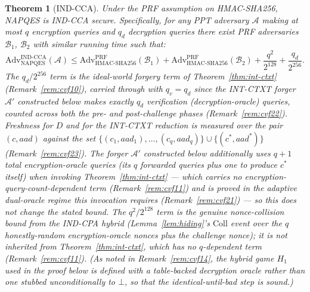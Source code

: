 \documentclass[11pt,a4paper]{article}
\newtheorem{theorem}{Theorem}[section]
\begin{document}
\begin{theorem}[IND-CCA]\label{thm:ind-cca}
  Under the PRF assumption on HMAC-SHA256, NAPQES is IND-CCA secure.
  Specifically, for any PPT adversary $\mathcal{A}$ making at most $q$
  encryption queries and $q_d$ decryption queries there exist PRF adversaries
  $\mathcal{B}_1$, $\mathcal{B}_2$ with similar running time such that:
  \[
    \mathrm{Adv}^{\mathrm{IND\text{-}CCA}}_{\mathrm{NAPQES}}(\mathcal{A})
    \leq
    \mathrm{Adv}^{\mathrm{PRF}}_{\mathrm{HMAC\text{-}SHA256}}(\mathcal{B}_1)
    +
    \mathrm{Adv}^{\mathrm{PRF}}_{\mathrm{HMAC\text{-}SHA256}}(\mathcal{B}_2)
    + \frac{q^2}{2^{128}}
    + \frac{q_d}{2^{256}}.
  \]
  The $q_d/2^{256}$ term is the ideal-world forgery term of
  Theorem~\ref{thm:int-ctxt} (Remark~\ref{rem:cvf10}), carried through
  with $q_v = q_d$ since the INT-CTXT forger $\mathcal{A}'$ constructed
  below makes exactly $q_d$ verification (decryption-oracle) queries,
  counted across \emph{both} the pre- and post-challenge phases
  (Remark~\ref{rem:cvf22}). Freshness for $D$ and for the INT-CTXT
  reduction is measured over the pair $(c,aad)$ against the set
  $\{(c_1,aad_1),\ldots,(c_q,aad_q)\}\cup\{(c^*,aad^*)\}$
  (Remark~\ref{rem:cvf23}). The forger $\mathcal{A}'$ constructed below
  additionally uses $q+1$ total encryption-oracle queries (its $q$
  forwarded queries plus one to produce $c^*$ itself) when invoking
  Theorem~\ref{thm:int-ctxt} --- which carries no
  encryption-query-count-dependent term (Remark~\ref{rem:cvf11}) and is
  proved in the adaptive dual-oracle regime this invocation requires
  (Remark~\ref{rem:cvf21}) --- so this does not change the stated bound.
  The $q^2/2^{128}$ term is the genuine nonce-collision bound from the
  IND-CPA hybrid (Lemma~\ref{lem:hiding}'s $\mathrm{Coll}$ event over the
  $q$ honestly-random encryption-oracle nonces plus the challenge nonce);
  it is \emph{not} inherited from Theorem~\ref{thm:int-ctxt}, which has no
  $q$-dependent term (Remark~\ref{rem:cvf11}).
  (As noted in Remark~\ref{rem:cvf14}, the hybrid game $H_1$ used in the
  proof below is defined with a table-backed decryption oracle rather
  than one stubbed unconditionally to $\bot$, so that the
  identical-until-bad step is sound.)
\end{theorem}
\end{document}
